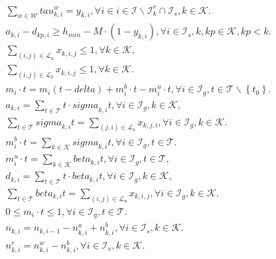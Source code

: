 \begin{align}
  & \sum_{w \in \mathcal{W}} \mathit{tau}_{k , i}^{w} = y_{k , i} , \forall i \in i \in \mathcal{I} \backslash \mathcal{I}_{k}^{r} \cap \mathcal{I}_{s} , k \in \mathcal{K} . \tag{eq\_0016} \\
  & a_{k , i} - d_{kp , i} \geq h_{min} - M \cdot \left(1 - y_{k , i}\right) , \forall i \in \mathcal{I}_{s} , k , kp \in \mathcal{K} , kp < k . \tag{eq\_0017} \\
  & \sum_{\left(i , j\right) \in \mathcal{L}_{u}} x_{k , i , j} \leq 1 , \forall k \in \mathcal{K} , \tag{eq\_0018} \\
  & \sum_{\left(i , j\right) \in \mathcal{L}_{b}} x_{k , i , j} \leq 1 , \forall k \in \mathcal{K} . \tag{eq\_0019} \\
  & m_{i} \cdot t = m_{i} \left(t - \mathit{delta}\right) + m_{i}^{b} \cdot t - m_{i}^{u} \cdot t , \forall i \in \mathcal{I}_{g} , t \in \mathcal{T} \backslash \left\{t_{0}\right\} . \tag{eq\_0020} \\
  & a_{k , i} = \sum_{t \in \mathcal{T}} t \cdot \mathit{sigma}_{k , i} t , \forall i \in \mathcal{I}_{g} , k \in \mathcal{K} , \tag{eq\_0021} \\
  & \sum_{t \in \mathcal{T}} \mathit{sigma}_{k , i} t = \sum_{\left(j , i\right) \in \mathcal{L}_{b}} x_{k , j , i} , \forall i \in \mathcal{I}_{g} , k \in \mathcal{K} . \tag{eq\_0022} \\
  & m_{i}^{b} \cdot t = \sum_{k \in \mathcal{K}} \mathit{sigma}_{k , i} t , \forall i \in \mathcal{I}_{g} , t \in \mathcal{T} . \tag{eq\_0023} \\
  & m_{i}^{u} \cdot t = \sum_{k \in \mathcal{K}} \mathit{beta}_{k , i} t , \forall i \in \mathcal{I}_{g} , t \in \mathcal{T} , \tag{eq\_0024} \\
  & d_{k , i} = \sum_{t \in \mathcal{T}} t \cdot \mathit{beta}_{k , i} t , \forall i \in \mathcal{I}_{g} , k \in \mathcal{K} , \tag{eq\_0025} \\
  & \sum_{t \in \mathcal{T}} \mathit{beta}_{k , i} t = \sum_{\left(i , j\right) \in \mathcal{L}_{u}} x_{k , i , j} , \forall i \in \mathcal{I}_{g} , k \in \mathcal{K} . \tag{eq\_0026} \\
  & 0 \leq m_{i} \cdot t \leq 1 , \forall i \in \mathcal{I}_{g} , t \in \mathcal{T} . \tag{eq\_0027} \\
  & n_{k , i} = n_{k , i - 1} - n_{k , i}^{a} + n_{k , i}^{b} , \forall i \in \mathcal{I}_{s} , k \in \mathcal{K} . \tag{eq\_0035} \\
  & n_{k , i}^{r} = n_{k , i}^{w} - n_{k , i}^{b} , \forall i \in \mathcal{I}_{s} , k \in \mathcal{K} . \tag{eq\_0036} \\

\end{align}

